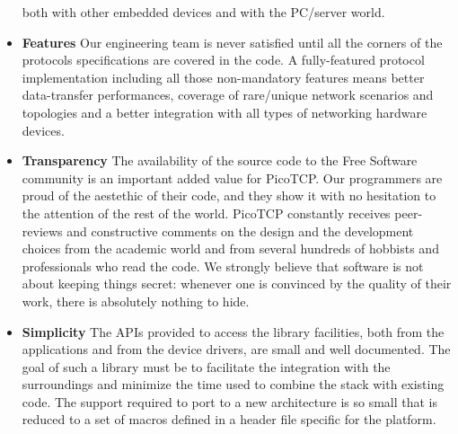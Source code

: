 \begin{itemize}
both with other embedded devices and with the PC/server world.
\item \textbf{Features} Our engineering team is never satisfied until all
the corners of the protocols specifications are covered in the code.
A fully-featured protocol implementation including all those non-mandatory
features means better data-transfer performances, coverage of rare/unique 
network scenarios and topologies and a better integration with all types of
networking hardware devices.
\item \textbf{Transparency} The availability of the source code to the Free
Software community is an important added value for PicoTCP. Our programmers
are proud of the aestethic of their code, and they show it with no
hesitation to the attention of the rest of the world.
PicoTCP constantly receives peer-reviews and constructive comments on the
design and the development choices from the academic world and from several
hundreds of hobbists and professionals who read the code. We strongly
believe that software is not about keeping things secret: whenever one is
convinced by the quality of their work, there is absolutely nothing to hide.
\item \textbf{Simplicity} The APIs provided to access the library
facilities, both from the applications and from the device drivers, are
small and well documented. The goal of such a library must be to facilitate
the integration with the surroundings and minimize the time used to combine
the stack with existing code. The support required to port to a new
architecture is so small that is reduced to a set of macros defined in a
header file specific for the platform.
\end{itemize}


